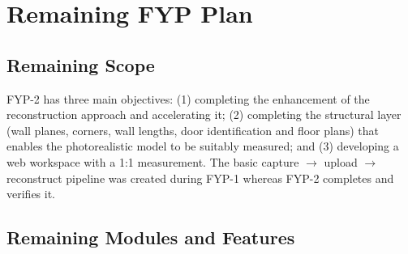 \chapter{Remaining FYP Plan}
\label{ch:plan}

\section{Remaining Scope}
FYP-2 has three main objectives: (1) completing the enhancement of the reconstruction approach and accelerating it; (2) completing the structural layer (wall planes, corners, wall lengths, door identification and floor plans) that enables the photorealistic model to be suitably measured; and (3) developing a web workspace with a 1:1 measurement. The basic capture $\rightarrow$ upload $\rightarrow$ reconstruct pipeline was created during FYP-1 whereas FYP-2 completes and verifies it.

\section{Remaining Modules and Features}

